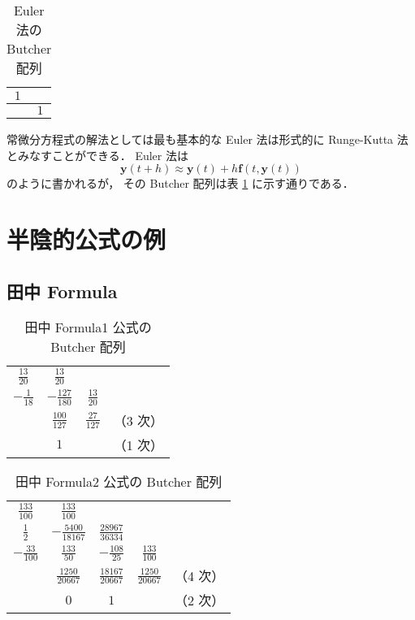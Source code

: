 \begin{table}[bp]
    \caption{Euler 法の Butcher 配列}
    \label{table:ode_runge-kutta_butcher-array-explicit-euler}
    \centering
    \begin{tabular}{c|c}
        $1$ &     \\
        \hline
            & $1$
    \end{tabular}
\end{table}

常微分方程式の解法としては最も基本的な Euler 法は形式的に Runge-Kutta 法とみなすことができる．
Euler 法は
\begin{equation}
    \bm{y}(t + h) \approx \bm{y}(t) + h \bm{f}(t, \bm{y}(t))
\end{equation}
のように書かれるが，
その Butcher 配列は表 \ref{table:ode_runge-kutta_butcher-array-explicit-euler} に示す通りである．

\section{半陰的公式の例}

\subsection{田中 Formula}

\begin{table}[bp]
    \caption{田中 Formula1 公式の Butcher 配列}
    \label{table:ode_runge-kutta_butcher-array-tanaka-formula1}
    \centering
    \begin{tabular}{c|ccc}
        $\frac{13}{20}$ & $\frac{13}{20}$    &                  &          \\
        $-\frac{1}{18}$ & $-\frac{127}{180}$ & $\frac{13}{20}$  &          \\
        \hline
                        & $\frac{100}{127}$  & $\frac{27}{127}$ & （3 次） \\
                        & $1$                &                  & （1 次）
    \end{tabular}
\end{table}

\begin{table}[bp]
    \caption{田中 Formula2 公式の Butcher 配列}
    \label{table:ode_runge-kutta_butcher-array-tanaka-formula2}
    \centering
    \begin{tabular}{c|cccc}
        $\frac{133}{100}$ & $\frac{133}{100}$     &                       &                      &          \\
        $\frac{1}{2}$     & $-\frac{5400}{18167}$ & $\frac{28967}{36334}$ &                      &          \\
        $-\frac{33}{100}$ & $\frac{133}{50}$      & $-\frac{108}{25}$     & $\frac{133}{100}$    &          \\
        \hline
                          & $\frac{1250}{20667}$  & $\frac{18167}{20667}$ & $\frac{1250}{20667}$ & （4 次） \\
                          & $0$                   & $1$                   &                      & （2 次）
    \end{tabular}
\end{table}


